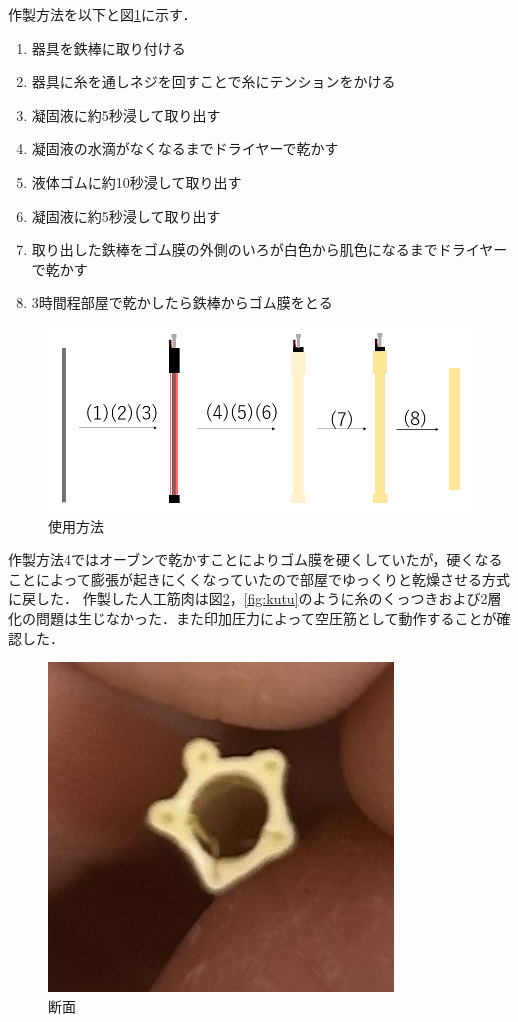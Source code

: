 作製方法を以下と図\ref{fig:ten}に示す．
\begin{enumerate}
  \item 器具を鉄棒に取り付ける
  \item 器具に糸を通しネジを回すことで糸にテンションをかける
  \item 凝固液に約5秒浸して取り出す
  \item 凝固液の水滴がなくなるまでドライヤーで乾かす
  \item 液体ゴムに約10秒浸して取り出す
  \item 凝固液に約5秒浸して取り出す
  \item 取り出した鉄棒をゴム膜の外側のいろが白色から肌色になるまでドライヤーで乾かす
　\item 3時間程部屋で乾かしたら鉄棒からゴム膜をとる
\end{enumerate}
\begin{figure}[h]
  \centering  %
  \includegraphics[scale=0.4]{pic/ten.PNG}
  \caption{使用方法}
  \label{fig:ten}
\end{figure}
作製方法4ではオーブンで乾かすことによりゴム膜を硬くしていたが，硬くなることによって膨張が起きにくくなっていたので部屋でゆっくりと乾燥させる方式に戻した．
作製した人工筋肉は図\ref{fig:2sou}，\ref{fig:kutu}のように糸のくっつきおよび2層化の問題は生じなかった．また印加圧力によって空圧筋として動作することが確認した．
\begin{figure}[h]
  \centering  %
  \includegraphics[scale=0.4]{pic/2sou.jpg}
  \caption{断面}
  \label{fig:2sou}
\end{figure}
